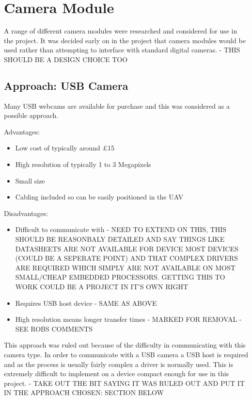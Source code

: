 \section{Camera Module}
\label{sec:John_options}

A range of different camera modules were researched and considered for use in the project. It was decided early on in the project that camera modules would be used rather than attempting to interface with standard digital cameras. - THIS SHOULD BE A DESIGN CHOICE TOO

\subsection{Approach: USB Camera}
\label{sec:USB_option}
Many USB webcams are available for purchase and this was considered as a possible approach.

Advantages:
      \begin{itemize}
         \item Low cost of typically around \pounds 15
         \item High resolution of typically 1 to 3 Megapixels
		 \item Small size
		 \item Cabling included so can be easily positioned in the UAV
     \end{itemize}

Disadvantages:
     \begin{itemize}
        \item Difficult to communicate with - NEED TO EXTEND ON THIS, THIS SHOULD BE REASONBALY DETAILED AND SAY THINGS LIKE DATASHEETS ARE NOT AVAILABLE FOR DEVICE MOST DEVICES (COULD BE A SEPERATE POINT) AND THAT COMPLEX DRIVERS ARE REQUIRED WHICH SIMPLY ARE NOT AVAILABLE ON MOST SMALL/CHEAP EMBEDDED PROCESSORS. GETTING THIS TO WORK COULD BE A PROJECT IN IT'S OWN RIGHT
        \item Requires USB host device - SAME AS ABOVE
	\item High resolution means longer transfer times - MARKED FOR REMOVAL - SEE ROBS COMMENTS
     \end{itemize}

This approach was ruled out because of the difficulty in communicating with this camera type. In order to communicate with a USB camera a USB host is required and as the process is usually fairly complex a driver is normally used. This is extremely difficult to implement on a device compact enough for use in this project. - TAKE OUT THE BIT SAYING IT WAS RULED OUT AND PUT IT IN THE APPROACH CHOSEN: SECTION BELOW

